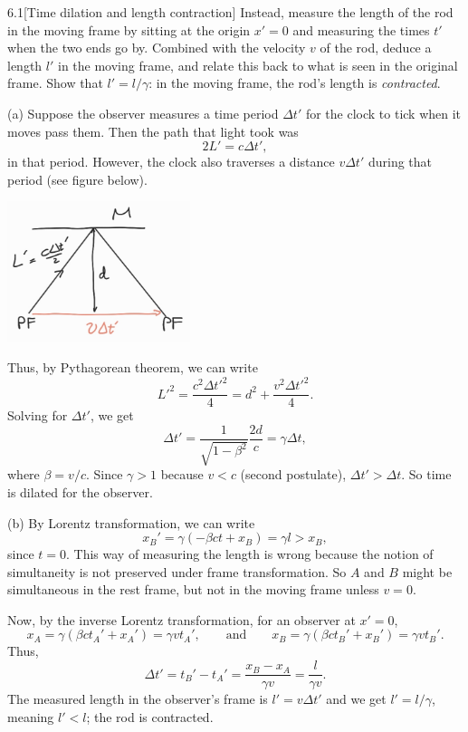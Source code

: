 \documentclass[12pt]{article}
\begin{document}
\begin{problem}{6.1}[Time dilation and length contraction]
Instead, measure the length of the rod in the moving frame by sitting at the
origin $x'=0$ and measuring the times $t'$ when the two ends go by. Combined
with the velocity $v$ of the rod, deduce a length $l'$ in the moving frame, and
relate this back to what is seen in the original frame. Show that $l'=l/\gamma$:
in the moving frame, the rod's length is \textit{contracted}.
\begin{solution}
(a) Suppose the observer measures a time period $\Delta t'$ for the clock to
tick when it moves pass them. Then the path that light took was
\begin{equation}
    2L'=c\Delta t', 
\end{equation}
in that period. However, the clock also traverses a distance $v\Delta t'$ during
that period (see figure below).
\begin{center}
    \includegraphics[width=0.4\textwidth]{hw6_p1.jpg} 
\end{center}
Thus, by Pythagorean theorem, we can write
\begin{equation}
    L'^2=\frac{c^2\Delta t'^2}{4}
    =d^2+\frac{v^2\Delta t'^2}{4}.
\end{equation}
Solving for $\Delta t'$, we get
\begin{equation}
    \Delta t'=\frac1{\sqrt{1-\beta^2}}\frac{2d}{c}
    =\gamma\Delta t,
\end{equation}
where $\beta=v/c$. Since $\gamma>1$ because $v<c$ (second postulate), 
$\Delta t'> \Delta t$. So time is dilated for the observer.

(b) By Lorentz transformation, we can write
\begin{equation}
    x_B'=\gamma(-\beta ct+x_B)=\gamma l>x_B, 
\end{equation}
since $t=0$. This way of measuring the length is wrong because the notion of
simultaneity is not preserved under frame transformation. So $A$ and $B$ might
be simultaneous in the rest frame, but not in the moving frame unless $v=0$.

Now, by the inverse Lorentz transformation, for an observer at $x'=0$,
\begin{equation}
    x_A=\gamma(\beta ct_A'+x_A')
    =\gamma vt_A',\qquad\text{and}\qquad
    x_B=\gamma(\beta ct_B'+x_B')
    =\gamma vt_B'.
\end{equation}
Thus,
\begin{equation}
    \Delta t'=t_B'-t_A'=\frac{x_B-x_A}{\gamma v}
    =\frac{l}{\gamma v}.
\end{equation}
The measured length in the observer's frame is $l'=v\Delta t'$ and we get
$l'=l/\gamma$, meaning $l'<l$; the rod is contracted.
\end{solution}
\end{problem}
\end{document}

